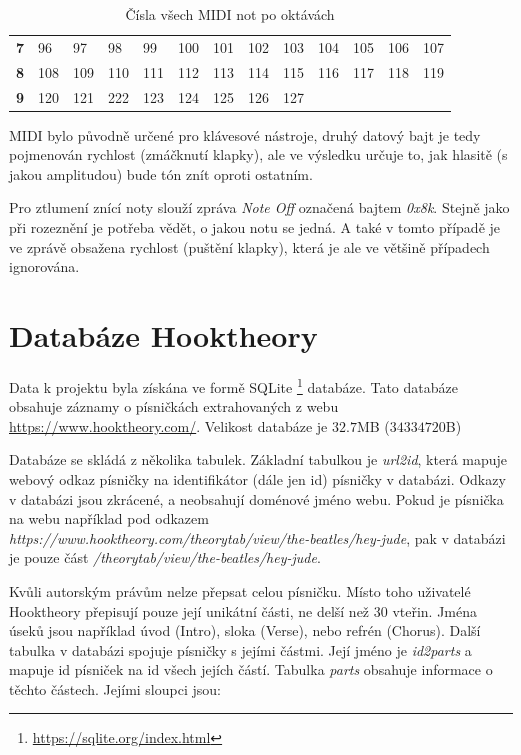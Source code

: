 \begin{table}[]
\begin{tabular}{l|llllllllllll}
        \textbf{7}                       & 96         & 97           & 98         & 99           & 100        & 101        & 102          & 103        & 104          & 105        & 106          & 107        \\
        \textbf{8}                       & 108        & 109          & 110        & 111          & 112        & 113        & 114          & 115        & 116          & 117        & 118          & 119        \\
        \textbf{9}                       & 120        & 121          & 222        & 123          & 124        & 125        & 126          & 127        & \multicolumn{4}{l}{}                                 
    \end{tabular}
    \caption{Čísla všech MIDI not po oktávách \cite{Back_SMF_Specif}}
    \label{tableMIDINotes}
\end{table}

MIDI bylo původně určené pro klávesové nástroje, 
druhý datový bajt je tedy pojmenován rychlost (zmáčknutí klapky),
ale ve výsledku určuje to, jak hlasitě (s jakou amplitudou) bude tón znít oproti ostatním.

Pro ztlumení znící noty slouží zpráva \emph{Note Off} označená bajtem \emph{0x8k}.
Stejně jako při rozeznění je potřeba vědět, o jakou notu se jedná.
A také v tomto případě je ve zprávě obsažena rychlost (puštění klapky), 
která je ale ve většině případech ignorována.
\cite{MIDI_tutorials}

\section{Databáze Hooktheory}
\label{hooktheoryDB}
Data k projektu byla získána ve formě SQLite
\footnote{\url{https://sqlite.org/index.html}} databáze.
Tato databáze obsahuje záznamy o písničkách extrahovaných z webu \url{https://www.hooktheory.com/}.
Velikost databáze je $32.7$MB ($34 334 720$B)

Databáze se skládá z několika tabulek.
Základní tabulkou je \emph{url2id}, 
která mapuje webový odkaz písničky na identifikátor (dále jen id) písničky v databázi.
Odkazy v databázi jsou zkrácené, a neobsahují doménové jméno webu.
Pokud je písnička na webu 
například pod odkazem \emph{https://www.hooktheory.com/theorytab/view/the-beatles/hey-jude},
pak v databázi je pouze část \emph{/theorytab/view/the-beatles/hey-jude}.
\par

Kvůli autorským právům nelze přepsat celou písničku.
Místo toho uživatelé Hooktheory přepisují pouze její unikátní části, 
ne delší než 30 vteřin.
Jména úseků jsou například úvod (Intro), sloka (Verse), nebo refrén (Chorus).
\cite{ht_guide}
Další tabulka v databázi spojuje písničky s jejími částmi.
Její jméno je \emph{id2parts} a mapuje id písniček na id všech jejích částí.
Tabulka \emph{parts} obsahuje informace o těchto částech.
Jejími sloupci jsou:

